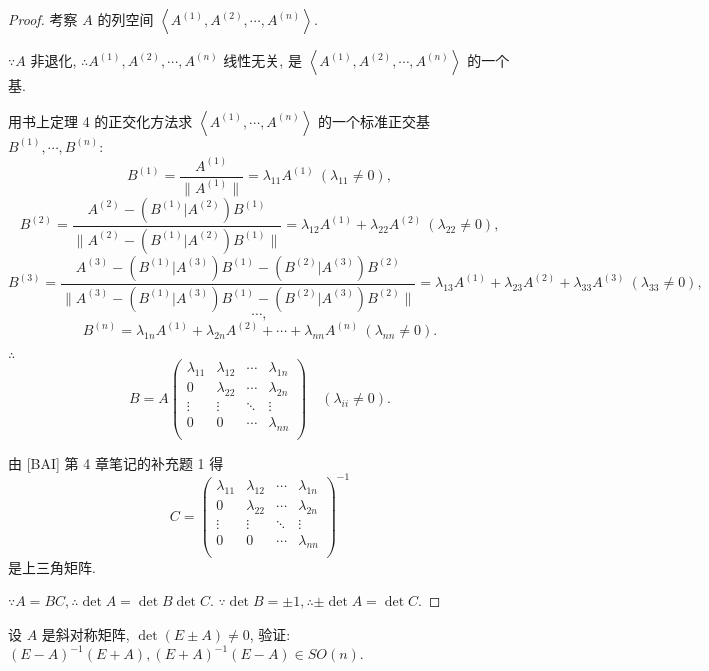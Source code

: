 \documentclass[color=black,device=normal,lang=cn,mode=geye]{elegantnote}
\begin{document}
\begin{proof}
    考察 $A$ 的列空间 $\left<A^{(1)},A^{(2)},\cdots,A^{(n)}\right>$.
    
    $\because A$ 非退化, $\therefore A^{(1)},A^{(2)},\cdots,A^{(n)}$ 线性无关, 是 $\left<A^{(1)},A^{(2)},\cdots,A^{(n)}\right>$ 的一个基.

    用书上定理 4 的正交化方法求 $\left<A^{(1)},\cdots,A^{(n)}\right>$ 的一个标准正交基 $B^{(1)},\cdots,B^{(n)}$:
    \[B^{(1)}=\dfrac{A^{(1)}}{\|A^{(1)}\|}=\lambda_{11}A^{(1)}\ (\lambda_{11}\neq0),\]
    \[B^{(2)}=\dfrac{A^{(2)}-(B^{(1)}|A^{(2)})B^{(1)}}{\|A^{(2)}-(B^{(1)}|A^{(2)})B^{(1)}\|}=\lambda_{12}A^{(1)}+\lambda_{22}A^{(2)}\ (\lambda_{22}\neq0),\]
    \[B^{(3)}=\dfrac{A^{(3)}-(B^{(1)}|A^{(3)})B^{(1)}-(B^{(2)}|A^{(3)})B^{(2)}}{\|A^{(3)}-(B^{(1)}|A^{(3)})B^{(1)}-(B^{(2)}|A^{(3)})B^{(2)}\|}=\lambda_{13}A^{(1)}+\lambda_{23}A^{(2)}+\lambda_{33}A^{(3)}\ (\lambda_{33}\neq0),\]
    \[\cdots,\]
    \[B^{(n)}=\lambda_{1n}A^{(1)}+\lambda_{2n}A^{(2)}+\cdots+\lambda_{nn}A^{(n)}\ (\lambda_{nn}\neq0).\]

    $\therefore$
    \[B=A\begin{pmatrix}
        \lambda_{11} & \lambda_{12} & \cdots & \lambda_{1n} \\
        0 & \lambda_{22} & \cdots & \lambda_{2n} \\
        \vdots & \vdots & \ddots & \vdots \\
        0 & 0 & \cdots & \lambda_{nn} \\
    \end{pmatrix}\quad(\lambda_{ii}\neq0).\]

    由 [BAI] 第 4 章笔记的补充题 1 得
    \[C=\begin{pmatrix}
        \lambda_{11} & \lambda_{12} & \cdots & \lambda_{1n} \\
        0 & \lambda_{22} & \cdots & \lambda_{2n} \\
        \vdots & \vdots & \ddots & \vdots \\
        0 & 0 & \cdots & \lambda_{nn} \\
    \end{pmatrix}^{-1}\]
    是上三角矩阵.

    $\because A=BC,\therefore\det A=\det B\det C$. $\because\det B=\pm1,\therefore\pm\det A=\det C$.
\end{proof}
\begin{exercise}[包含 1.4 的一部分命题]%
    设 $A$ 是斜对称矩阵, $\det(E\pm A)\neq0$, 验证: $(E-A)^{-1}(E+A),(E+A)^{-1}(E-A)\in SO(n)$.
\end{exercise}
\end{document}
